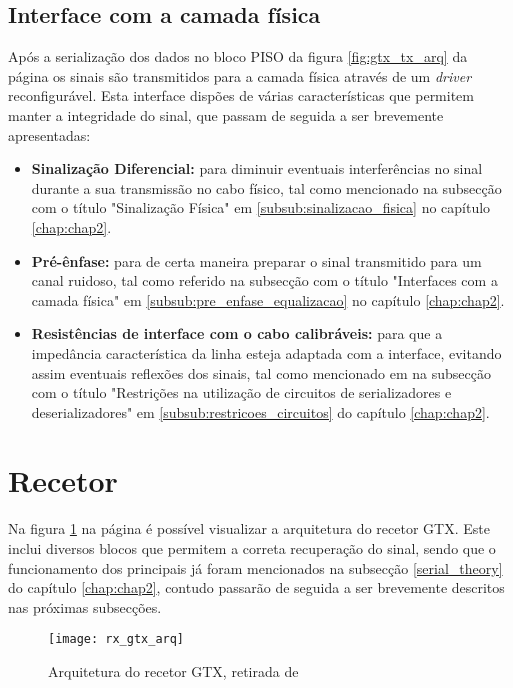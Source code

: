 \subsection{Interface com a camada física} 
Após a serialização dos dados no bloco PISO da figura \ref{fig:gtx_tx_arq} da página \pageref{fig:gtx_tx_arq} os sinais são transmitidos para a camada física através de um \textit{driver} reconfigurável. Esta interface dispões de várias características que permitem manter a integridade do sinal, que passam de seguida a ser brevemente apresentadas:
\begin{itemize}
	\item \textbf{Sinalização Diferencial:} para diminuir eventuais interferências no sinal durante a sua transmissão no cabo físico, tal como mencionado na subsecção com o título "Sinalização Física" em \ref{subsub:sinalizacao_fisica} no capítulo \ref{chap:chap2}.
	\item \textbf{Pré-ênfase:} para de certa maneira preparar o sinal transmitido para um canal ruidoso, tal como referido na subsecção com o título "Interfaces com a camada física" em \ref{subsub:pre_enfase_equalizacao} no capítulo \ref{chap:chap2}.
	\item \textbf{Resistências de interface com o cabo calibráveis:} para que a impedância característica da linha esteja adaptada com a interface, evitando assim eventuais reflexões dos sinais, tal como mencionado em na subsecção com o título "Restrições na utilização de circuitos de serializadores e deserializadores" em \ref{subsub:restricoes_circuitos} do capítulo \ref{chap:chap2}.
\end{itemize}


\section{Recetor} \label{sec_rx_gtx}
Na figura \ref{fig:gtx_rx_arq} na página \pageref{fig:gtx_rx_arq} é possível visualizar a arquitetura do recetor GTX. Este inclui diversos blocos que permitem a correta recuperação do sinal, sendo que o funcionamento dos principais já foram mencionados na subsecção \ref{serial_theory} do capítulo \ref{chap:chap2}, contudo passarão de seguida a ser brevemente descritos nas próximas subsecções. 

\begin{figure}[h!]
	\begin{center}
		\leavevmode
		\texttt{[image: rx\_gtx\_arq]}
		\centering
		\caption{Arquitetura do recetor GTX, retirada de \cite{R011}}
		\label{fig:gtx_rx_arq}
	\end{center}
\end{figure}
	

